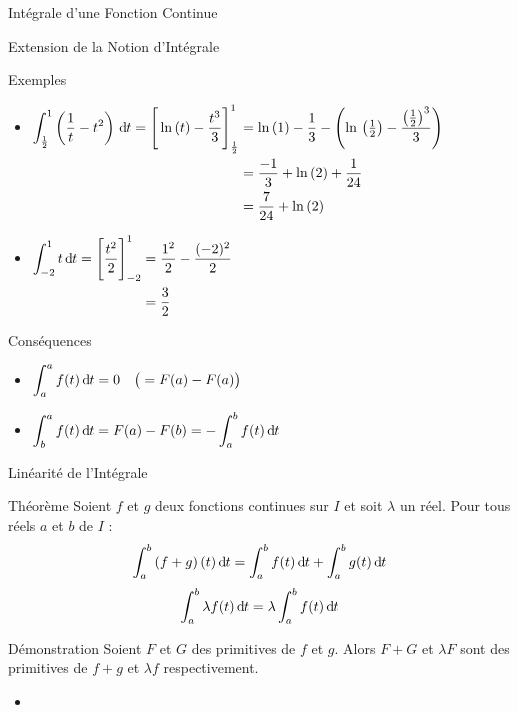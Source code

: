 \documentclass{coursbook}
\begin{document}
\begin{Gpartie}{Intégrale d'une Fonction Continue}
\begin{Spartie}{Extension de la Notion d'Intégrale}
\begin{SSpartie}{Exemples}
\begin{itemize}
                    \item 
                    $\begin{aligned}[t]
                        \int_\frac{1}{2}^1\left(\frac{1}{t}-t^2\right)\dt=\Bigg[\ln\,(t)-\frac{t^3}{3}\Bigg]_\frac{1}{2}^1&=\ln\,(1)-\frac{1}{3}-\left(\ln\,\left(\tfrac{1}{2}\right)-\frac{\left(\frac{1}{2}\right)^3}{3}\right) \\
                        &=\frac{-1}{3}+\ln\,(2)+\frac{1}{24} \\
                        &=\frac{7}{24}+\ln\,(2)
                    \end{aligned}$
                    \item 
                    $\begin{aligned}[t]
                        \int_{-2}^1t\dt=\Bigg[\frac{t^2}{2}\Bigg]_{-2}^1&=\frac{1^2}{2}-\frac{(-2)^2}{2} \\
                        &=\frac{3}{2}
                    \end{aligned}$
                \end{itemize}
            \end{SSpartie}
            \begin{SSpartie}{Conséquences} 
                \begin{itemize}
                    \item $\displaystyle\int_a^af(t)\,\mathrm{d}\hspace*{-0.05em}t=0\quad\big(=F(a)-F(a)\big)$
                    \item $\displaystyle\int_b^af(t)\,\mathrm{d}\hspace*{-0.05em}t=F(a)-F(b)=-\int_a^b f(t)\,\mathrm{d}\hspace*{-0.05em}t$
                \end{itemize}
            \end{SSpartie}
        \end{Spartie}
        \begin{Spartie}{Linéarité de l'Intégrale} 
            \begin{SSpartie}{Théorème} 
                Soient $f$ et $g$ deux fonctions continues sur $I$ et soit $\lambda$ un réel. Pour tous réels $a$ et $b$ de $I$ : \[\int_a^b\left(f+g\right)(t)\,\mathrm{d}\hspace*{-0.05em}t=\int_a^b f(t)\,\mathrm{d}\hspace*{-0.05em}t+\int_a^bg(t)\,\mathrm{d}\hspace*{-0.05em}t\] \[\int_a^b\lambda f(t)\,\mathrm{d}\hspace*{-0.05em}t=\lambda\int_a^b f(t)\,\mathrm{d}\hspace*{-0.05em}t\]
                \begin{SSSpartie}{Démonstration} 
                    Soient $F$ et $G$ des primitives de $f$ et $g$. Alors $F+G$ et $\lambda F$ sont des primitives de $f+g$ et $\lambda f$ respectivement.
                    \begin{itemize}
                        \item 

\end{itemize}
\end{SSSpartie}
\end{SSpartie}
\end{Spartie}
\end{Gpartie}
\end{document}
